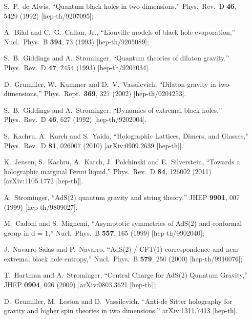 \documentclass[12pt]{article}
\begin{document}
{\begin{thebibliography}{99}
  S.~P.~de Alwis,
  ``Quantum black holes in two-dimensions,''
  Phys.\ Rev.\ D {\bf 46}, 5429 (1992)
  [hep-th/9207095];

  A.~Bilal and C.~G.~Callan, Jr.,
  ``Liouville models of black hole evaporation,''
  Nucl.\ Phys.\ B {\bf 394}, 73 (1993)
  [hep-th/9205089];
  
  S.~B.~Giddings and A.~Strominger,
  ``Quantum theories of dilaton gravity,''
  Phys.\ Rev.\ D {\bf 47}, 2454 (1993)
  [hep-th/9207034].

  D.~Grumiller, W.~Kummer and D.~V.~Vassilevich,
  ``Dilaton gravity in two-dimensions,''
  Phys.\ Rept.\  {\bf 369}, 327 (2002)
  [hep-th/0204253].
  
  S.~B.~Giddings and A.~Strominger,
  ``Dynamics of extremal black holes,''
  Phys.\ Rev.\ D {\bf 46}, 627 (1992)
  [hep-th/9202004].

  S.~Kachru, A.~Karch and S.~Yaida,
  ``Holographic Lattices, Dimers, and Glasses,''
  Phys.\ Rev.\ D {\bf 81}, 026007 (2010)
  [arXiv:0909.2639 [hep-th]].
  
  K.~Jensen, S.~Kachru, A.~Karch, J.~Polchinski and E.~Silverstein,
  ``Towards a holographic marginal Fermi liquid,''
  Phys.\ Rev.\ D {\bf 84}, 126002 (2011)
  [arXiv:1105.1772 [hep-th]].

 A.~Strominger,
  ``AdS(2) quantum gravity and string theory,''
  JHEP {\bf 9901}, 007 (1999)
  [hep-th/9809027];
  
  M.~Cadoni and S.~Mignemi,
  ``Asymptotic symmetries of AdS(2) and conformal group in d = 1,''
  Nucl.\ Phys.\ B {\bf 557}, 165 (1999)
  [hep-th/9902040];
  
  J.~Navarro-Salas and P.~Navarro,
  ``AdS(2) / CFT(1) correspondence and near extremal black hole entropy,''
  Nucl.\ Phys.\ B {\bf 579}, 250 (2000)
  [hep-th/9910076];
  
   T.~Hartman and A.~Strominger,
  ``Central Charge for AdS(2) Quantum Gravity,''
  JHEP {\bf 0904}, 026 (2009)
  [arXiv:0803.3621 [hep-th]];
  
  D.~Grumiller, M.~Leston and D.~Vassilevich,
  ``Anti-de Sitter holography for gravity and higher spin theories in two dimensions,''
  arXiv:1311.7413 [hep-th].
  

\end{thebibliography}}
\end{document}
